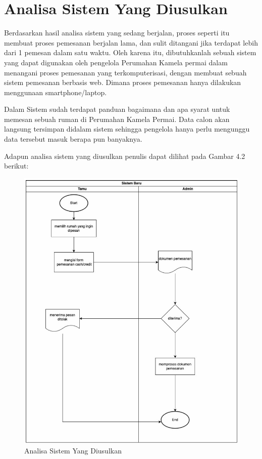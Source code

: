 \section{Analisa Sistem Yang Diusulkan}
\par Berdasarkan hasil analisa sistem yang sedang berjalan, proses seperti itu membuat proses pemesanan berjalan lama, dan sulit ditangani jika terdapat lebih dari 1 pemesan dalam satu waktu. Oleh karena itu, dibutuhkanlah sebuah sistem yang dapat digunakan oleh pengelola Perumahan Kamela permai dalam menangani proses pemesanan yang terkomputerisasi, dengan membuat sebuah sistem pemesanan berbasis web. Dimana proses pemesanan hanya dilakukan menggunaan smartphone/laptop.
\par Dalam Sistem  sudah terdapat panduan bagaimana dan apa syarat untuk memesan sebuah ruman di Perumahan Kamela Permai. Data calon  akan langsung tersimpan didalam sistem sehingga pengelola hanya perlu mengunggu data tersebut masuk berapa pun banyaknya.
\par Adapun analisa sistem yang diusulkan penulis dapat dilihat pada Gambar 4.2 berikut:
\begin{figure}
\centering
    \includegraphics[width=0.90\linewidth]{Analisa Sistem Yang Diusulkan.png}
    \caption{Analisa Sistem Yang Diusulkan}
\end{figure}
